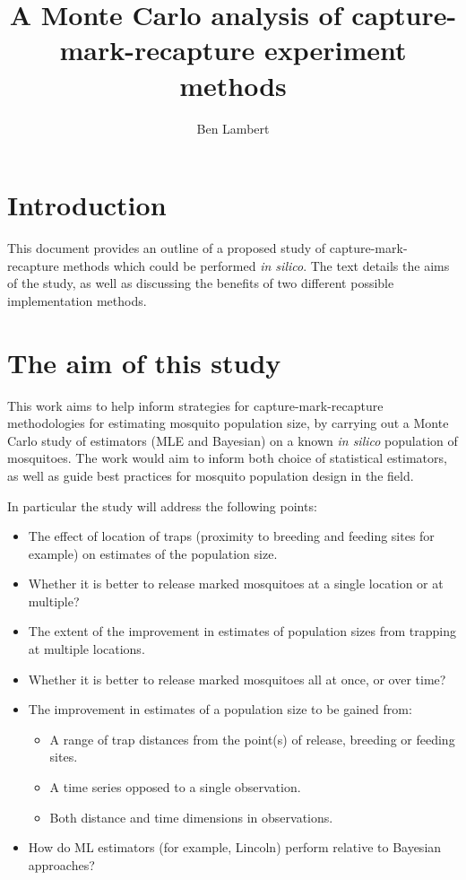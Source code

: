 \documentclass{article}
\title{A Monte Carlo analysis of capture-mark-recapture experiment methods}
\author{Ben Lambert}
\begin{document}
\maketitle
\tableofcontents

\section{Introduction}
This document provides an outline of a proposed study of capture-mark-recapture methods which could be performed \textit{in silico}. The text details the aims of the study, as well as discussing the benefits of two different possible implementation methods.

\section{The aim of this study}
This work aims to help inform strategies for capture-mark-recapture methodologies for estimating mosquito population size, by carrying out a Monte Carlo study of estimators (MLE and Bayesian) on a known \textit{in silico} population of mosquitoes. The work would aim to inform both choice of statistical estimators, as well as guide best practices for mosquito population design in the field.

In particular the study will address the following points:

\begin{itemize}
\item The effect of location of traps (proximity to breeding and feeding sites for example) on estimates of the population size.
\item Whether it is better to release marked mosquitoes at a single location or at multiple?
\item The extent of the improvement in estimates of population sizes from trapping at multiple locations.
\item Whether it is better to release marked mosquitoes all at once, or over time?
\item The improvement in estimates of a population size to be gained from:
\begin{itemize}
\item A range of trap distances from the point(s) of release, breeding or feeding sites.
\item A time series opposed to a single observation.
\item Both distance and time dimensions in observations.
\end{itemize}
\item How do ML estimators (for example, Lincoln) perform relative to Bayesian approaches?
\end{itemize}
\end{document}

